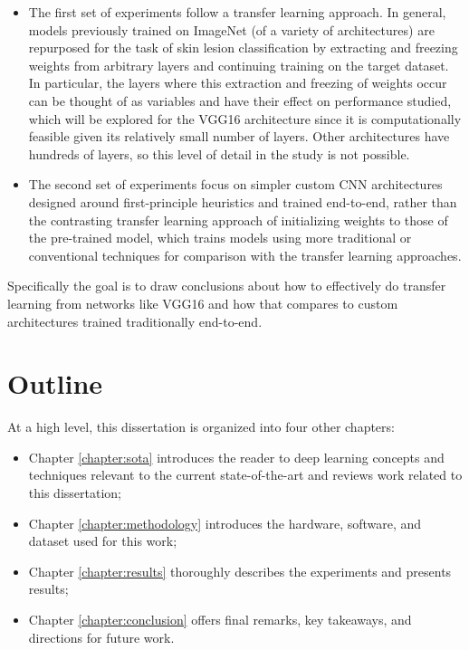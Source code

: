 \begin{itemize}
    \item The first set of experiments follow a transfer learning approach. In general, models previously trained on ImageNet (of a variety of architectures) are repurposed for the task of skin lesion classification by extracting and freezing weights from arbitrary layers and continuing training on the target dataset. In particular, the layers where this extraction and freezing of weights occur can be thought of as variables and have their effect on performance studied, which will be explored for the VGG16 architecture since it is computationally feasible given its relatively small number of layers. Other architectures have hundreds of layers, so this level of detail in the study is not possible.
    \item The second set of experiments focus on simpler custom \ac{CNN} architectures designed around first-principle heuristics and trained end-to-end, rather than the contrasting transfer learning approach of initializing weights to those of the pre-trained model, which trains models using more traditional or conventional techniques for comparison with the transfer learning approaches.
\end{itemize}

Specifically the goal is to draw conclusions about how to effectively do transfer learning from networks like VGG16 and how that compares to custom architectures trained traditionally end-to-end.

\section{Outline}

At a high level, this dissertation is organized into four other chapters:

\begin{itemize}
    \item Chapter \ref{chapter:sota} introduces the reader to deep learning concepts and techniques relevant to the current state-of-the-art and reviews work related to this dissertation;
    \item Chapter \ref{chapter:methodology} introduces the hardware, software, and dataset used for this work;
    \item Chapter \ref{chapter:results} thoroughly describes the experiments and presents results;
    \item Chapter \ref{chapter:conclusion} offers final remarks, key takeaways, and directions for future work.
\end{itemize}
